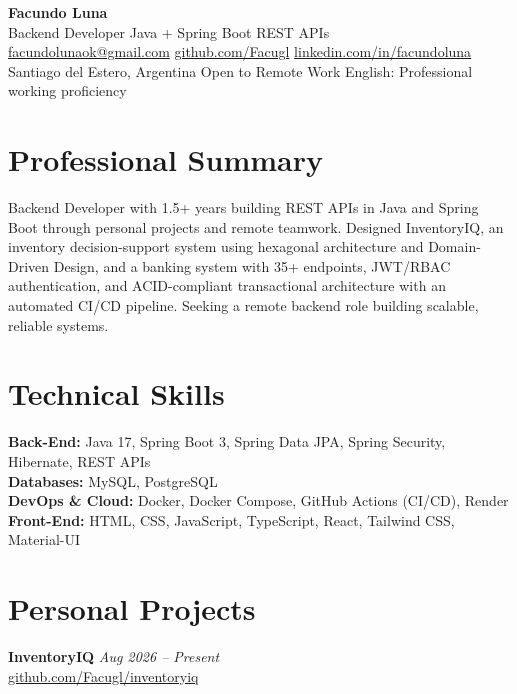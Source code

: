 \documentclass[11pt,a4paper]{article}
\newcommand{\entry}[3]{%
  \noindent\textbf{#1} \hfill \textit{#2} \\
  #3
}
\begin{document}
\enlargethispage{2\baselineskip}

\begin{center}
  {\LARGE \textbf{Facundo Luna}}\\[2pt]
  {\large Backend Developer \textbar{} Java + Spring Boot \textbar{} REST APIs}\\[4pt]
  \small
  \href{mailto:facundolunaok@gmail.com}{facundolunaok@gmail.com} \textbar{}
  \href{https://github.com/Facugl}{github.com/Facugl} \textbar{}
  \href{https://linkedin.com/in/facundoluna}{linkedin.com/in/facundoluna} \\[2pt]
  Santiago del Estero, Argentina \textbar{} Open to Remote Work \textbar{} English: Professional working proficiency
\end{center}

\section*{Professional Summary}
Backend Developer with 1.5+ years building REST APIs in Java and Spring Boot through personal projects and remote teamwork. Designed InventoryIQ, an inventory decision-support system using hexagonal architecture and Domain-Driven Design, and a banking system with 35+ endpoints, JWT/RBAC authentication, and ACID-compliant transactional architecture with an automated CI/CD pipeline. Seeking a remote backend role building scalable, reliable systems.

\section*{Technical Skills}
\noindent\textbf{Back-End:} Java 17, Spring Boot 3, Spring Data JPA, Spring Security, Hibernate, REST APIs \\
\textbf{Databases:} MySQL, PostgreSQL \\
\textbf{DevOps \& Cloud:} Docker, Docker Compose, GitHub Actions (CI/CD), Render \\
\textbf{Front-End:} HTML, CSS, JavaScript, TypeScript, React, Tailwind CSS, Material-UI

\section*{Personal Projects}

\entry{InventoryIQ}{Aug 2026 -- Present}{\href{https://github.com/Facugl/inventoryiq}{github.com/Facugl/inventoryiq}}
\vspace{3pt}
\end{document}
